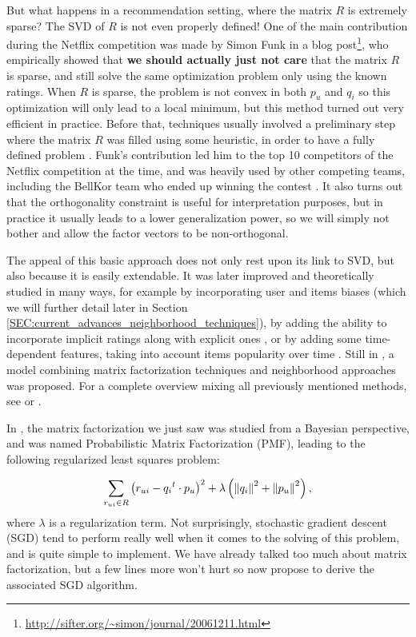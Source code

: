 But what happens in a recommendation setting, where the matrix $R$ is extremely
sparse? The SVD of $R$ is not even properly defined! One of the main
contribution during the Netflix competition was made by Simon Funk in a blog
post\footnote{\url{http://sifter.org/~simon/journal/20061211.html}}, who empirically
showed that \textbf{we should actually just not care} that the matrix $R$ is
sparse, and still solve the same optimization problem only using the known
ratings.  When $R$ is sparse, the problem is not convex in both $p_u$ and $q_i$
so this optimization will only lead to a local minimum, but this method turned
out very efficient in practice. Before that, techniques usually involved  a
preliminary step where the matrix $R$ was filled using some heuristic, in order
to have a fully defined problem \cite{SarKarKonRie00}. Funk's contribution led
him to the top 10 competitors of the Netflix competition at the time, and was
heavily used by other competing teams, including the BellKor team who ended up
winning the contest \cite{Kor09}. It also turns out that the orthogonality
constraint is useful for interpretation purposes, but in practice it usually
leads to a lower generalization power, so we will simply not bother and allow
the factor vectors to be non-orthogonal.

The appeal of this basic approach does not only rest upon its link to SVD, but
also because it is easily extendable. It was later improved and theoretically
studied in many ways, for example by incorporating user and items biases
\cite{KorACM2010} (which we will further detail later in Section
\ref{SEC:current_advances_neighborhood_techniques}), by adding the ability to
incorporate implicit ratings along with explicit ones \cite{Pat07, KorACM2010},
or by adding some time-dependent features, taking into account items popularity
over time \cite{Kor09}. Still in \cite{KorACM2010}, a model combining matrix
factorization techniques and neighborhood approaches was proposed. For a
complete overview mixing all previously mentioned methods, see \cite{KorBel11}
or \cite{KorBelVol09}.

In \cite{SalMni07}, the matrix factorization we just saw was studied from a Bayesian
perspective, and was named Probabilistic Matrix Factorization (PMF), leading to
the following regularized least squares problem:

$$
\sum_{r_{ui} \in R} \left(r_{ui} - {q_i}^t \cdot p_u \right)^2 +
\lambda\left({\left\lVert q_i\right\rVert}_{}^2 + {\left\lVert p_u\right\rVert}_{}^2\right),
$$
where $\lambda$ is a regularization term. Not
surprisingly, stochastic gradient descent (SGD) tend to perform really well
when it comes to the solving of this problem, and is quite simple to implement.
We have already talked too much about matrix factorization, but a few lines
more won't hurt so now propose to derive the associated SGD algorithm.

